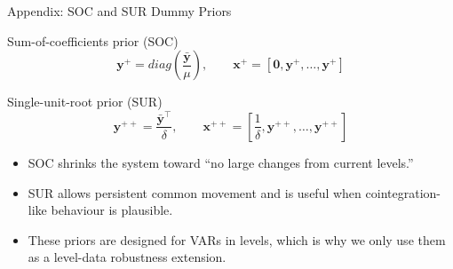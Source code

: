 \documentclass[10pt, aspectratio=169]{beamer}
\begin{document}
\begin{frame}{Appendix: SOC and SUR Dummy Priors}
\small
\begin{block}{Sum-of-coefficients prior (SOC)}
\[
  \boldsymbol{y^+} = diag\!\left(\frac{\bar{\boldsymbol{y}}}{\mu}\right),
  \qquad
  \boldsymbol{x^+} = [\boldsymbol{0}, \boldsymbol{y^+}, \dots, \boldsymbol{y^+}]
\]
\end{block}

\begin{block}{Single-unit-root prior (SUR)}
\[
  \boldsymbol{y^{++}} = \frac{\bar{\boldsymbol{y}}^\top}{\delta},
  \qquad
  \boldsymbol{x^{++}} = \left[\frac{1}{\delta}, \boldsymbol{y^{++}}, \dots, \boldsymbol{y^{++}}\right]
\]
\end{block}

\begin{itemize}
  \item SOC shrinks the system toward ``no large changes from current levels.''
  \item SUR allows persistent common movement and is useful when cointegration-like behaviour is plausible.
  \item These priors are designed for VARs in levels, which is why we only use them as a level-data robustness extension.
\end{itemize}
\end{frame}
\end{document}
